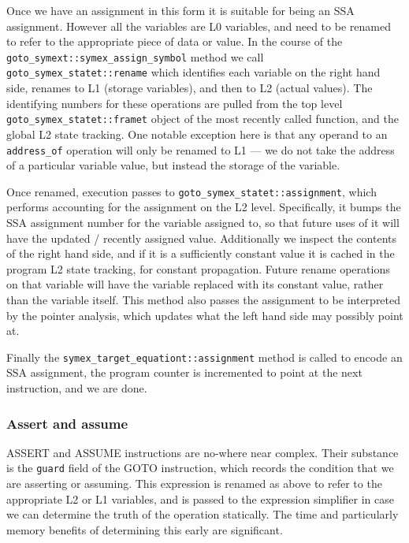 \documentclass{article}
\begin{document}
Once we have an assignment in this form it is suitable for being an SSA
assignment. However all the variables are L0 variables, and need to be
renamed to refer to the appropriate piece of data or value. In the course
of the \texttt{goto\_symext::symex\_assign\_symbol} method we call
\texttt{goto\_symex\_statet::rename} which identifies each variable on the
right hand side, renames to L1 (storage variables), and then to L2 (actual
values). The identifying numbers for these operations are pulled from the
top level \texttt{goto\_symex\_statet::framet} object of the most recently
called function, and the global L2 state tracking. One notable exception here
is that any operand to an \texttt{address\_of} operation will only be renamed
to L1 --- we do not take the address of a particular variable value, but
instead the storage of the variable.

Once renamed, execution passes to \texttt{goto\_symex\_statet::assignment},
which performs accounting for the assignment on the L2 level. Specifically,
it bumps the SSA assignment number for the variable assigned to, so that future
uses of it will have the updated / recently assigned value. Additionally
we inspect the contents of the right hand side, and if it is a
sufficiently\textsuperscript{\texttrademark} constant value it is cached
in the program L2 state tracking, for constant propagation. Future rename
operations on that variable will have the variable replaced with its constant
value, rather than the variable itself. This method also passes the
assignment to be interpreted by the pointer analysis, which updates what the
left hand side may possibly point at.

Finally the \texttt{symex\_target\_equationt::assignment} method is called
to encode an SSA assignment, the program counter is incremented to point at the
next instruction, and we are done.

\subsubsection{Assert and assume}

ASSERT and ASSUME instructions are no-where near complex. Their substance
is the \texttt{guard} field of the GOTO instruction, which records the condition
that we are asserting or assuming. This expression is renamed as above to refer
to the appropriate L2 or L1 variables, and is passed to the expression
simplifier in case we can determine the truth of the operation statically.
The time and particularly memory benefits of determining this early are
significant.
\end{document}
